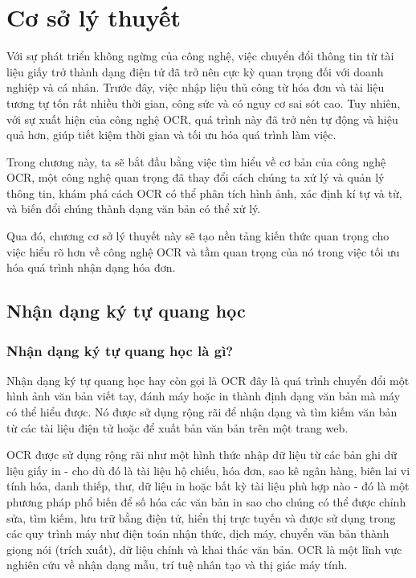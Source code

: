 \chapter{Cơ sở lý thuyết}
Với sự phát triển không ngừng của công nghệ, việc chuyển đổi thông tin từ tài liệu giấy trở thành dạng điện tử đã trở nên cực kỳ quan trọng đối với doanh nghiệp và cá nhân. Trước đây, việc nhập liệu thủ công từ hóa đơn và tài liệu tương tự tốn rất nhiều thời gian, công sức và có nguy cơ sai sót cao. Tuy nhiên, với sự xuất hiện của công nghệ OCR, quá trình này đã trở nên tự động và hiệu quả hơn, giúp tiết kiệm thời gian và tối ưu hóa quá trình làm việc.

Trong chương này, ta sẽ bắt đầu bằng việc tìm hiểu về cơ bản của công nghệ OCR, một công nghệ quan trọng đã thay đổi cách chúng ta xử lý và quản lý thông tin, khám phá cách OCR có thể phân tích hình ảnh, xác định kí tự và từ, và biến đổi chúng thành dạng văn bản có thể xử lý.

Qua đó, chương cơ sở lý thuyết này sẽ tạo nền tảng kiến thức quan trọng cho việc hiểu rõ hơn về công nghệ OCR và tầm quan trọng của nó trong việc tối ưu hóa quá trình nhận dạng hóa đơn.

\section{Nhận dạng ký tự quang học}
\subsection{Nhận dạng ký tự quang học là gì?}
Nhận dạng ký tự quang học hay còn gọi là OCR đây là quá trình chuyển đổi một hình ảnh văn bản viết tay, đánh máy hoặc in thành định dạng văn bản mà máy có thể hiểu được. Nó được sử dụng rộng rãi để nhận dạng và tìm kiếm văn bản từ các tài liệu điện tử hoặc để xuất bản văn bản trên một trang web. \cite{aws, survey_ocr_Applications}

OCR được sử dụng rộng rãi như một hình thức nhập dữ liệu từ các bản ghi dữ liệu giấy in - cho dù đó là tài liệu hộ chiếu, hóa đơn, sao kê ngân hàng, biên lai vi tính hóa, danh thiếp, thư, dữ liệu in hoặc bất kỳ tài liệu phù hợp nào - đó là một phương pháp phổ biến để số hóa các văn bản in sao cho chúng có thể được chỉnh sửa, tìm kiếm, lưu trữ bằng điện tử, hiển thị trực tuyến và được sử dụng trong các quy trình máy như điện toán nhận thức, dịch máy, chuyển văn bản thành giọng nói (trích xuất), dữ liệu chính và khai thác văn bản. OCR là một lĩnh vực nghiên cứu về nhận dạng mẫu, trí tuệ nhân tạo và thị giác máy tính.\cite{wiki}

